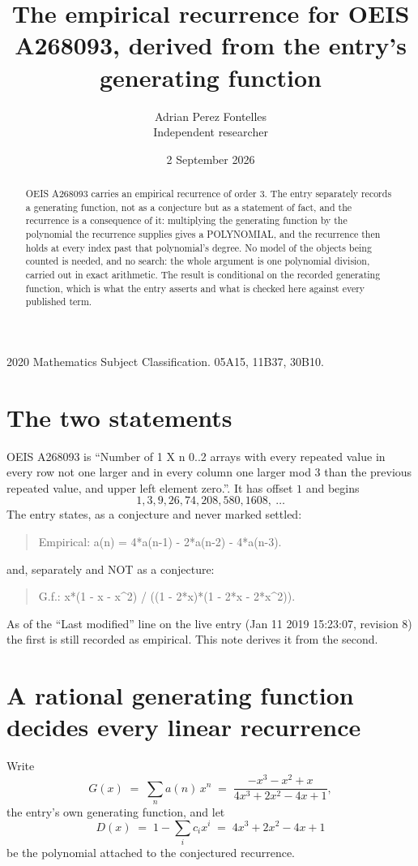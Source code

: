 \documentclass[11pt,a4paper]{article}
\title{The empirical recurrence for OEIS A268093, derived from the entry's generating function}
\author{Adrian Perez Fontelles\\ \small Independent researcher}
\date{2 September 2026}
\theoremstyle{plain}
\theoremstyle{definition}
\begin{document}
\maketitle

\begin{abstract}
OEIS A268093 carries an empirical recurrence of order $3$. The entry separately records a
generating function, not as a conjecture but as a statement of fact, and the recurrence is a
consequence of it: multiplying the generating function by the polynomial the recurrence
supplies gives a POLYNOMIAL, and the recurrence then holds at every index past that
polynomial's degree. No model of the objects being counted is needed, and no search: the
whole argument is one polynomial division, carried out in exact arithmetic. The result is
conditional on the recorded generating function, which is what the entry asserts and what is
checked here against every published term.
\end{abstract}

\noindent\small 2020 Mathematics Subject Classification. 05A15, 11B37, 30B10.\normalsize

\section{The two statements}

OEIS A268093 is ``Number of 1 X n 0..2 arrays with every repeated value in every row not one larger and in every column one larger mod 3 than the previous repeated value, and upper left element zero.''. It has offset $1$ and begins
\[
1, 3, 9, 26, 74, 208, 580, 1608,\ \dots
\]
The entry states, as a conjecture and never marked settled:
\begin{quote}
Empirical: a(n) = 4*a(n-1) - 2*a(n-2) - 4*a(n-3).
\end{quote}
and, separately and NOT as a conjecture:
\begin{quote}
G.f.: x*(1 - x - x\^{}2) / ((1 - 2*x)*(1 - 2*x - 2*x\^{}2)).
\end{quote}
As of the ``Last modified'' line on the live entry (Jan 11 2019 15:23:07, revision 8) the first is still
recorded as empirical. This note derives it from the second.

\section{A rational generating function decides every linear recurrence}

Write
\[
G(x)\;=\;\sum_{n}a(n)\,x^{n}\;=\;\frac{- x^{3} - x^{2} + x}{4 x^{3} + 2 x^{2} - 4 x + 1},
\]
the entry's own generating function, and let
\[
D(x)\;=\;1-\sum_i c_i x^{i}\;=\;4 x^{3} + 2 x^{2} - 4 x + 1
\]
be the polynomial attached to the conjectured recurrence.
\end{document}
